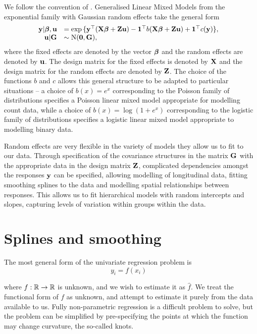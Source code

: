 We follow the convention of \citep{Zhao2006}. Generalised Linear Mixed Models from the exponential family with
Gaussian random effects take the general form
$$
\begin{array}{rl}
	{\bf y} | {\boldsymbol \beta}, {\bf u} &= \exp{\{ {\bf y}^\top ({\bf X}{\boldsymbol\beta}+ {\bf Z}{\bf u}) - {\bf1}^\top b({\bf X}{\boldsymbol\beta}+ {\bf Z}{\bf u}) + {\bf1}^\top c({\bf y}) \}}, \\
	{\bf u} | {\bf G} &\sim \text{N}({\bf 0}, {\bf G}),
\end{array}
$$
where the fixed effects are denoted by the vector ${\boldsymbol \beta}$ and the random effects are denoted by ${\bf u}$. The
design matrix for the fixed effects is denoted by ${\bf X}$ and the design matrix for the random effects are
denoted by ${\bf Z}$. The choice of the functions $b$ and $c$ allows this general structure to be adapted to
particular situations -- a choice of $b(x) = e^x$ corresponding to the Poisson family of distributions
specifies a Poisson linear mixed model appropriate for modelling count data, while a choice of $b(x) = \log(1
+ e^x)$ corresponding to the logistic family of distributions specifies a logistic linear mixed model
appropriate to modelling binary data.

Random effects are very flexible in the variety of models they allow us to fit to our data. Through
specification of the covariance structures in the matrix ${\bf G}$ with the appropriate data in the design matrix
${\bf Z}$, complicated dependencies amongst the responses ${\bf y}$ can be specified, allowing modelling of
longitudinal data, fitting smoothing splines to the data and modelling spatial relationships between
responses. This allows us to fit hierarchical models with random intercepts and slopes, capturing levels of variation within groups within the data.
\citep{Gelman2007}

\section{Splines and smoothing}
The most general form of the univariate regression problem is
\[
	y_i = f(x_i)
\]

where $f: {\mathbb{R}} \to {\mathbb{R}}$ is unknown, and we wish to estimate it as $\hat{f}$. We treat the functional form of
$f$ as unknown, and attempt to estimate it purely from the data available to us. Fully non-parametric regression
is a difficult problem to solve, but the problem can be simplified by pre-specifying the points at which the
function may change curvature, the so-called knots.

